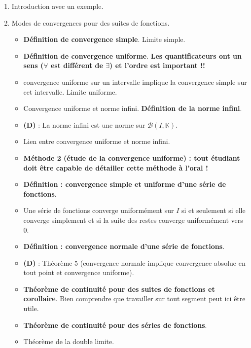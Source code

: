 \documentclass[twoside,a4paper,french,10pt]{VcCours}
\begin{document}
\begin{enumerate}
\item Introduction avec un exemple.
\item Modes de convergences pour des suites de fonctions. 
\begin{itemize}
\item \textbf{Définition de convergence simple}. Limite simple.
\item \textbf{Définition de convergence uniforme}. 
    \textbf{Les quantificateurs ont un sens ($\forall$ est différent de $\exists$) et l'ordre est important !!}
\item convergence uniforme sur un intervalle implique la 
    convergence simple sur cet intervalle. Limite uniforme.
\item Convergence uniforme et norme infini. 
    \textbf{Définition de la norme infini}.
\item \textbf{(D)} : La norme infini est une norme sur 
    $\mathcal{B}(I, \mathbb{K})$.
\item Lien entre convergence uniforme et norme infini.
\item \textbf{Méthode 2 (étude de la convergence uniforme) : 
    tout étudiant doit être capable de détailler cette méthode 
    à l'oral !}
\item \textbf{Définition : convergence simple et uniforme d'une série de fonctions}.
\item Une série de fonctions converge uniformément sur $I$ si et seulement si elle converge simplement et si la suite des restes converge uniformément vers $0$.
\item \textbf{Définition : convergence normale d'une série de fonctions}.
\item \textbf{(D)} : Théorème 5 (convergence normale implique convergence absolue en tout point et convergence uniforme).
\item \textbf{Théorème de continuité pour des suites de fonctions et corollaire}. Bien comprendre que travailler sur tout segment peut ici être utile.
\item \textbf{Théorème de continuité pour des séries de fonctions}.
\item Théorème de la double limite.
\end{itemize}
\end{enumerate}



\end{document}
